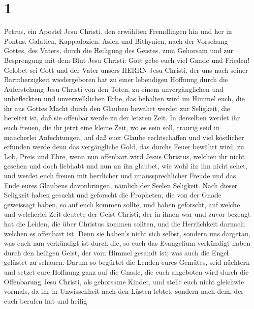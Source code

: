 \hypertarget{section}{%
\section{1}\label{section}}

 Petrus, ein Apostel Jesu Christi, den erwählten Fremdlingen
hin und her in Pontus, Galatien, Kappadozien, Asien und Bithynien,
 nach der Vorsehung Gottes, des Vaters, durch die Heiligung
des Geistes, zum Gehorsam und zur Besprengung mit dem Blut Jesu Christi:
Gott gebe euch viel Gnade und Frieden!  Gelobet sei Gott und
der Vater unsers HERRN Jesu Christi, der uns nach seiner Barmherzigkeit
wiedergeboren hat zu einer lebendigen Hoffnung durch die Auferstehung
Jesu Christi von den Toten,  zu einem unvergänglichen und
unbefleckten und unverwelklichen Erbe, das behalten wird im Himmel
 euch, die ihr aus Gottes Macht durch den Glauben bewahrt
werdet zur Seligkeit, die bereitet ist, daß sie offenbar werde zu der
letzten Zeit.  In derselben werdet ihr euch freuen, die ihr
jetzt eine kleine Zeit, wo es sein soll, traurig seid in mancherlei
Anfechtungen,  auf daß euer Glaube rechtschaffen und viel
köstlicher erfunden werde denn das vergängliche Gold, das durchs Feuer
bewährt wird, zu Lob, Preis und Ehre, wenn nun offenbart wird Jesus
Christus,  welchen ihr nicht gesehen und doch liebhabt und
nun an ihn glaubet, wie wohl ihr ihn nicht sehet, und werdet euch freuen
mit herrlicher und unaussprechlicher Freude  und das Ende
eures Glaubens davonbringen, nämlich der Seelen Seligkeit. 
Nach dieser Seligkeit haben gesucht und geforscht die Propheten, die von
der Gnade geweissagt haben, so auf euch kommen sollte,  und
haben geforscht, auf welche und welcherlei Zeit deutete der Geist
Christi, der in ihnen war und zuvor bezeugt hat die Leiden, die über
Christus kommen sollten, und die Herrlichkeit darnach; 
welchen es offenbart ist. Denn sie haben's nicht sich selbst, sondern
uns dargetan, was euch nun verkündigt ist durch die, so euch das
Evangelium verkündigt haben durch den heiligen Geist, der vom Himmel
gesandt ist; was auch die Engel gelüstet zu schauen.  Darum
so begürtet die Lenden eures Gemütes, seid nüchtern und setzet eure
Hoffnung ganz auf die Gnade, die euch angeboten wird durch die
Offenbarung Jesu Christi,  als gehorsame Kinder, und stellt
euch nicht gleichwie vormals, da ihr in Unwissenheit nach den Lüsten
lebtet;  sondern nach dem, der euch berufen hat und heilig

